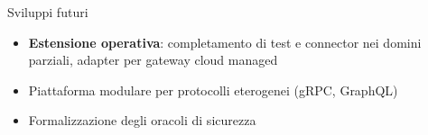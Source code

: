 
\begin{frame}{Sviluppi futuri}
  \begin{itemize}
    \item \textbf{Estensione operativa}: completamento di \alert{test} e \alert{connector} nei domini parziali, adapter per \alert{gateway cloud managed}

    \item Piattaforma modulare per \alert{protocolli eterogenei} (gRPC, GraphQL)

    \item \alert{Formalizzazione} degli oracoli di sicurezza
  \end{itemize}
\end{frame}